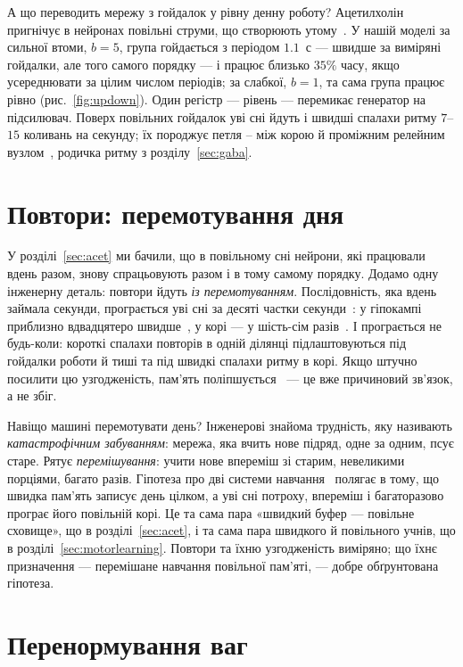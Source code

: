 А що переводить мережу з гойдалок у рівну денну роботу? Ацетилхолін пригнічує в нейронах повільні струми, що створюють утому~\cite{McCormick1992}. У нашій моделі за сильної втоми, $b=5$, група гойдається з періодом $1.1$~с --- швидше за виміряні гойдалки, але того самого порядку --- і працює близько $35\%$ часу, якщо усереднювати за цілим числом періодів; за слабкої, $b=1$, та сама група працює рівно (рис.~\ref{fig:updown}). Один регістр --- рівень  --- перемикає генератор на підсилювач. Поверх повільних гойдалок уві сні йдуть і швидші спалахи ритму $7$--$15$ коливань на секунду; їх породжує петля -- між корою й проміжним релейним вузлом~\cite{SteriadeMcCormickSejnowski1993}, родичка ритму з розділу~\ref{sec:gaba}.

\section{Повтори: перемотування дня}

У розділі~\ref{sec:acet} ми бачили, що в повільному сні нейрони, які працювали вдень разом, знову спрацьовують разом і в тому самому порядку. Додамо одну інженерну деталь: повтори йдуть \emph{із перемотуванням}. Послідовність, яка вдень займала секунди, програється уві сні за десяті частки секунди~\cite{Nadasdy1999}: у гіпокампі приблизно вдвадцятеро швидше~\cite{LeeWilson2002}, у корі --- у шість-сім разів~\cite{Euston2007}. І програється не будь-коли: короткі спалахи повторів в одній ділянці підлаштовуються під гойдалки роботи й тиші та під швидкі спалахи ритму в корі. Якщо штучно посилити цю узгодженість, пам'ять поліпшується~\cite{Maingret2016} --- це вже причиновий зв'язок, а не збіг.

Навіщо машині перемотувати день? Інженерові знайома трудність, яку називають \emph{катастрофічним забуванням}: мережа, яка вчить нове підряд, одне за одним, псує старе. Рятує \emph{перемішування}: учити нове впереміш зі старим, невеликими порціями, багато разів. Гіпотеза про дві системи навчання~\cite{McClelland1995} полягає в тому, що швидка пам'ять записує день цілком, а уві сні потроху, впереміш і багаторазово програє його повільній корі. Це та сама пара «швидкий буфер --- повільне сховище», що в розділі~\ref{sec:acet}, і та сама пара швидкого й повільного учнів, що в розділі~\ref{sec:motorlearning}. Повтори та їхню узгодженість виміряно; що їхнє призначення --- перемішане навчання повільної пам'яті, --- добре обґрунтована гіпотеза.

\section{Перенормування ваг}

